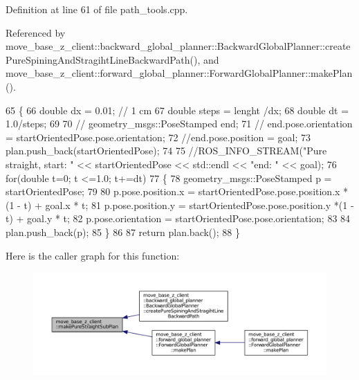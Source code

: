 Definition at line 61 of file path\+\_\+tools.\+cpp.



Referenced by move\+\_\+base\+\_\+z\+\_\+client\+::backward\+\_\+global\+\_\+planner\+::\+Backward\+Global\+Planner\+::create\+Pure\+Spining\+And\+Stragiht\+Line\+Backward\+Path(), and move\+\_\+base\+\_\+z\+\_\+client\+::forward\+\_\+global\+\_\+planner\+::\+Forward\+Global\+Planner\+::make\+Plan().


\begin{DoxyCode}
65     \{
66         \textcolor{keywordtype}{double} dx = 0.01; \textcolor{comment}{// 1 cm}
67         \textcolor{keywordtype}{double} steps = lenght /dx;
68         \textcolor{keywordtype}{double} dt = 1.0/steps;
69 
70         \textcolor{comment}{// geometry\_msgs::PoseStamped end;}
71         \textcolor{comment}{// end.pose.orientation = startOrientedPose.pose.orientation;}
72         \textcolor{comment}{//end.pose.position = goal;}
73         plan.push\_back(startOrientedPose);
74 
75         \textcolor{comment}{//ROS\_INFO\_STREAM("Pure straight, start: " << startOrientedPose << std::endl << "end: " << goal);}
76         \textcolor{keywordflow}{for}(\textcolor{keywordtype}{double} t=0; t <=1.0; t+=dt)
77         \{
78             geometry\_msgs::PoseStamped p = startOrientedPose;
79             
80             p.pose.position.x =  startOrientedPose.pose.position.x *(1 - t) + goal.x * t;
81             p.pose.position.y =  startOrientedPose.pose.position.y *(1 - t) + goal.y * t;
82             p.pose.orientation = startOrientedPose.pose.orientation;
83             
84             plan.push\_back(p);
85         \}
86     
87         \textcolor{keywordflow}{return} plan.back();
88     \}
\end{DoxyCode}


Here is the caller graph for this function\+:
\nopagebreak
\begin{figure}[H]
\begin{center}
\leavevmode
\includegraphics[width=350pt]{namespacemove__base__z__client_aeda8dd87896b3e31221df66d02313358_icgraph}
\end{center}
\end{figure}


